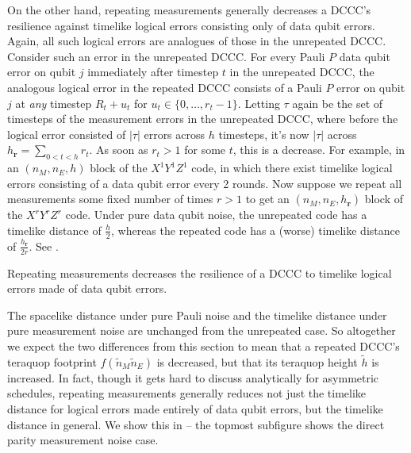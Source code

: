 On the other hand, repeating measurements generally decreases a DCCC's resilience against timelike logical errors consisting only of data qubit errors.
Again, all such logical errors are analogues of those in the unrepeated DCCC.
Consider such an error in the unrepeated DCCC.
For every Pauli $P$ data qubit error on qubit $j$ immediately after timestep $t$ in the unrepeated DCCC,
the analogous logical error in the repeated DCCC consists of a Pauli $P$ error on qubit $j$ at \emph{any} timestep $R_t + u_t$ for $u_t \in \{0, \ldots, r_t - 1\}$.
Letting $\tau$ again be the set of timesteps of the measurement errors in the unrepeated DCCC,
where before the logical error consisted of $|\tau|$ errors across $h$ timesteps,
it's now $|\tau|$ across $h_{\mathbf{r}} = \sum_{0 < t < h} r_t$.
As soon as $r_t > 1$ for some $t$, this is a decrease.
For example, in an $(n_M, n_E, h)$ block of the $X^1 Y^1 Z^1$ code,
in which there exist timelike logical errors consisting of a data qubit error every 2 rounds.
Now suppose we repeat all measurements some fixed number of times $r > 1$ to get an $(n_M, n_E, h_{\mathbf{r}})$ block of the $X^r Y^r Z^r$ code.
Under pure data qubit noise, the unrepeated code has a timelike distance of $\frac{h}{2}$,
whereas the repeated code has a (worse) timelike distance of $\frac{h_{\mathbf{r}}}{2r}$.
See .


\begin{difference}\label{dif:repeated_timelike_logicals}
    Repeating measurements decreases the resilience of a DCCC to timelike logical errors made of data qubit errors.
\end{difference}

The spacelike distance under pure Pauli noise and the timelike distance under pure measurement noise are unchanged from the unrepeated case.
So altogether we expect the two differences from this section to mean that a repeated DCCC's teraquop footprint $f(\tilde{n}_M \tilde{n}_E)$ is decreased, but that its teraquop height $\tilde{h}$ is increased.
In fact, though it gets hard to discuss analytically for asymmetric schedules, repeating measurements generally reduces not just the timelike distance for logical errors made entirely of data qubit errors, but the timelike distance in general.
We show this in  -- the topmost subfigure shows the direct parity measurement noise case.



